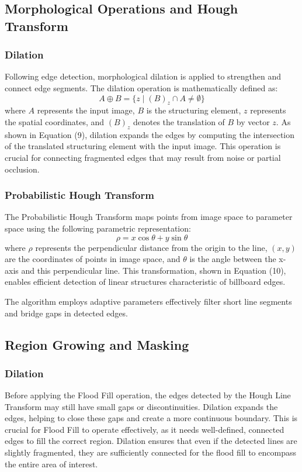 \documentclass[12pt]{article}
\begin{document}
\subsection{Morphological Operations and Hough Transform}
\subsubsection{Dilation}
Following edge detection, morphological dilation is applied to strengthen and connect edge segments. The dilation operation is mathematically defined as:
\begin{equation}
A \oplus B = \{ z \mid (B)_z \cap A \neq \emptyset \}
\end{equation}
where $A$ represents the input image, $B$ is the structuring element, $z$ represents the spatial coordinates, and $(B)_z$ denotes the translation of $B$ by vector $z$. As shown in Equation (9), dilation expands the edges by computing the intersection of the translated structuring element with the input image. This operation is crucial for connecting fragmented edges that may result from noise or partial occlusion.

\subsubsection{Probabilistic Hough Transform}%
The Probabilistic Hough Transform\cite{HoughLine}  maps points from image space to parameter space using the following parametric representation:
\begin{equation}
\rho = x\cos\theta + y\sin\theta
\end{equation}
where $\rho$ represents the perpendicular distance from the origin to the line, $(x,y)$ are the coordinates of points in image space, and $\theta$ is the angle between the x-axis and this perpendicular line. This transformation, shown in Equation (10), enables efficient detection of linear structures characteristic of billboard edges.

The algorithm employs adaptive parameters effectively filter short line segments and bridge gaps in detected edges.

\subsection{Region Growing and Masking}
\subsubsection{Dilation}
Before applying the Flood Fill operation, the edges detected by the Hough Line Transform may still have small gaps or discontinuities. Dilation expands the edges, helping to close these gaps and create a more continuous boundary. This is crucial for Flood Fill to operate effectively, as it needs well-defined, connected edges to fill the correct region. Dilation ensures that even if the detected lines are slightly fragmented, they are sufficiently connected for the flood fill to encompass the entire area of interest.
\end{document}
